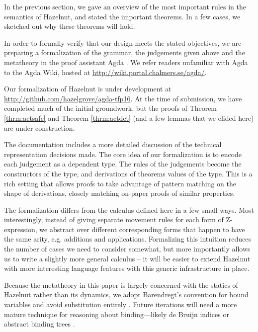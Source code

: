 In the previous section, we gave an overview of the most important rules in
the semantics of Hazelnut, and stated the important theorems. In a few
cases, we sketched out why these theorems will hold.

In order to formally verify that our design meets the stated objectives, we
are preparing a formalization of the grammar, the judgements given above
and the metatheory in the proof assistant Agda \cite{norell:thesis}. We
refer readers unfamiliar with Agda to the Agda Wiki, hosted
at \url{http://wiki.portal.chalmers.se/agda/}.

Our formalization of Hazelnut is under development at
\url{http://github.com/hazelgrove/agda-tfp16}. At the time of submission, we 
have completed much of the initial groundwork, but the proofs of 
Theorem \ref{thrm:actsafe} and Theorem \ref{thrm:actdet} (and a few  
lemmas that we elided here) are under construction.  

The documentation 
includes a more detailed discussion of the technical representation
decisions made. The core idea of our formalization is to encode each judgement as a
dependent type. The rules of the judgements become the constructors of the
type, and derivations of theorems values of the type. This is a rich
setting that allows proofs to take advantage of pattern matching on the
shape of derivations, closely matching on-paper proofs of similar
properties.

The formalization differs from the calculus defined here in a few small 
ways. Most interestingly, instead of giving separate movement rules for each 
form of Z-expression, we abstract
over different corresponding forms that happen to have the same arity, e.g. 
additions and applications. Formalizing this intuition
reduces the number of cases we need to consider 
somewhat, but more importantly allows us to write a slightly more
general calculus -- it will be easier to extend Hazelnut with more 
interesting language features with this generic infrastructure in place.

Because the metatheory in this paper is largely concerned with the statics
of Hazelnut rather than its dynamics, we adopt Barendregt's convention for
bound variables and avoid substitution entirely \cite{urban}. Future
iterations will need a more mature technique for reasoning about
binding---likely de Bruijn indices or abstract binding
trees \cite{lh09unibind,Pouillard11}. 
